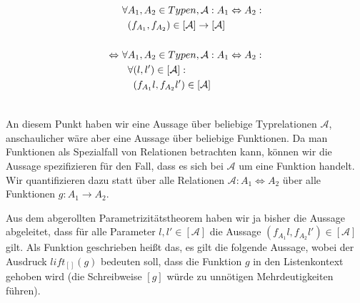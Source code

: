 \begin{align*}
&\forall A_1, A_2 \in Typen, \mathcal{A} : A_1 \Leftrightarrow A_2: \\
&\hphantom{\forall} (f_{A_1}, f_{A_2}) \in [\mathcal{A}] \rightarrow [\mathcal{A}] \\
& \\
\Leftrightarrow ~&
\forall A_1, A_2 \in Typen, \mathcal{A} : A_1 \Leftrightarrow A_2: \\
&\hphantom{\forall} \forall (l, l') \in [\mathcal{A}]: \\
&\hphantom{\forall \forall} (f_{A_1} l, f_{A_2} l') \in [\mathcal{A}] \\
& \\
\end{align*}


An diesem Punkt haben wir eine Aussage über beliebige Typrelationen $\mathcal{A}$, anschaulicher wäre aber eine Aussage
über beliebige Funktionen. Da man Funktionen als Spezialfall von Relationen betrachten kann, können wir die Aussage
spezifizieren für den Fall, dass es sich bei $\mathcal{A}$ um eine Funktion handelt. Wir quantifizieren dazu statt
über alle Relationen $\mathcal{A} : A_1 \Leftrightarrow A_2$ über alle Funktionen $g : A_1 \rightarrow A_2$.

Aus dem abgerollten Parametrizitätstheorem haben wir ja bisher die Aussage abgeleitet, dass für alle Parameter $l, l' \in [\mathcal{A}]$
die Aussage $(f_{A_1} l, f_{A_2} l') \in [\mathcal{A}]$ gilt.
Als Funktion geschrieben heißt das, es gilt die folgende Aussage, wobei der Ausdruck $lift_{[]}(g)$ bedeuten soll, dass die Funktion $g$ in
den Listenkontext gehoben wird (die Schreibweise $[g]$ würde zu unnötigen Mehrdeutigkeiten führen).

